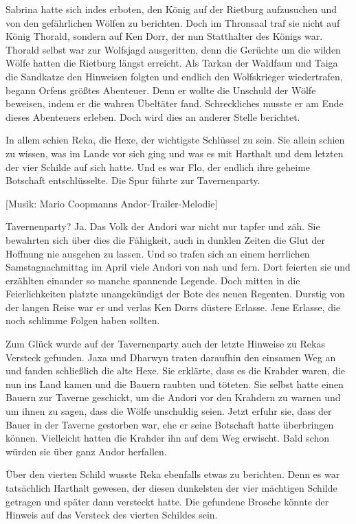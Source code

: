 \documentclass[10pt, a4paper, oneside]{book}
\begin{document}
\begin{multicols}{2}
Sabrina hatte sich indes erboten, den König auf der Rietburg aufzusuchen und von den gefährlichen Wölfen zu berichten. Doch im Thronsaal traf sie nicht auf König Thorald, sondern auf Ken Dorr, der nun Statthalter des Königs war. Thorald selbst war zur Wolfsjagd ausgeritten, denn die Gerüchte um die wilden Wölfe hatten die Rietburg längst erreicht. Als Tarkan der Waldfaun und Taiga die Sandkatze den Hinweisen folgten und endlich den Wolfskrieger wiedertrafen, begann Orfens größtes Abenteuer. Denn er wollte die Unschuld der Wölfe beweisen, indem er die wahren Übeltäter fand. Schreckliches musste er am Ende dieses Abenteuers erleben. Doch wird dies an anderer Stelle berichtet.

In allem schien Reka, die Hexe, der wichtigste Schlüssel zu sein. Sie allein schien zu wissen, was im Lande vor sich ging und was es mit Harthalt und dem letzten der vier Schilde auf sich hatte. Und es war Flo, der endlich ihre geheime Botschaft entschlüsselte. Die Spur führte zur Tavernenparty.
\bigskip

[Musik: Mario Coopmanns Andor-Trailer-Melodie]
\bigskip

Tavernenparty? Ja. Das Volk der Andori war nicht nur tapfer und zäh. Sie bewahrten sich über dies die Fähigkeit, auch in dunklen Zeiten die Glut der Hoffnung nie ausgehen zu lassen. Und so trafen sich an einem herrlichen Samstagnachmittag im April viele Andori von nah und fern. Dort feierten sie und erzählten einander so manche spannende Legende. Doch mitten in die Feierlichkeiten platzte unangekündigt der Bote des neuen Regenten. Durstig von der langen Reise war er und verlas Ken Dorrs düstere Erlasse. Jene Erlasse, die noch schlimme Folgen haben sollten.

Zum Glück wurde auf der Tavernenparty auch der letzte Hinweise zu Rekas Versteck gefunden. Jaxa und Dharwyn traten daraufhin den einsamen Weg an und fanden schließlich die alte Hexe. Sie erklärte, dass es die Krahder waren, die nun ins Land kamen und die Bauern raubten und töteten. Sie selbst hatte einen Bauern zur Taverne geschickt, um die Andori vor den Krahdern zu warnen und um ihnen zu sagen, dass die Wölfe unschuldig seien. Jetzt erfuhr sie, dass der Bauer in der Taverne gestorben war, ehe er seine Botschaft hatte überbringen können. Vielleicht hatten die Krahder ihn auf dem Weg erwischt. Bald schon würden sie über ganz Andor herfallen. 

Über den vierten Schild wusste Reka ebenfalls etwas zu berichten. Denn es war tatsächlich Harthalt gewesen, der diesen dunkelsten der vier mächtigen Schilde getragen und später dann versteckt hatte. Die gefundene Brosche könnte der Hinweis auf das Versteck des vierten Schildes sein. 


\end{multicols}
\end{document}
